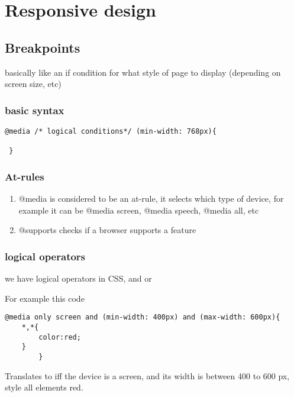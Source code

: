 \documentclass[11pt]{article}
\begin{document}
\section{Responsive design}
\label{sec:orgd61afae}
\subsection{Breakpoints}
\label{sec:org0c82751}
basically like an if condition for what style of page to display (depending on screen size, etc)
\subsubsection{basic syntax}
\label{sec:orgaa041bd}
\begin{verbatim}
@media /* logical conditions*/ (min-width: 768px){

 }

\end{verbatim}
\subsubsection{At-rules}
\label{sec:org03a3c6a}
\begin{enumerate}
\item @media
\label{sec:org3e32262}
is considered to be an at-rule, it selects which type of device, for example it can be @media screen, @media speech, @media all, etc
\item @supports
\label{sec:org4663856}
checks if a browser supports a feature
\end{enumerate}
\subsubsection{logical operators}
\label{sec:org10ff6bc}
we have logical operators in CSS, and or

For example this code
\begin{verbatim}
@media only screen and (min-width: 400px) and (max-width: 600px){
    *,*{
        color:red;
    }
        }
\end{verbatim}

Translates to iff the device is a screen, and its width is between 400 to 600 px, style all elements red.
\end{document}
